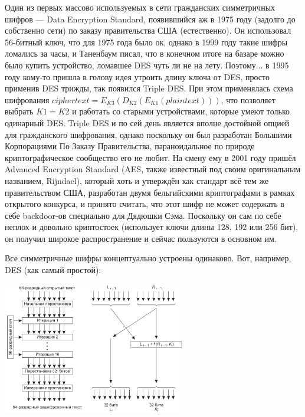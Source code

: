 \documentclass{../mcstext}
\begin{document}
Один из первых массово используемых в сети гражданских симметричных шифров --- Data Encryption Standard, появившийся аж в 1975 году (задолго до собственно сети) по заказу правительства США (естественно). Он использовал 56-битный ключ, что для 1975 года было ок, однако в 1999 году такие шифры ломались за часы, и Таненбаум писал, что в конечном итоге на базаре можно было купить устройство, ломавшее DES чуть ли не на лету. Поэтому... в 1995 году кому-то пришла в голову идея утроить длину ключа от DES, просто применив DES трижды, так появился Triple DES. При этом применялась схема шифрования $ciphertext = E_{K3}(D_{K2}(E_{K1}(plaintext)))$, что позволяет выбрать $K1 = K2$ и работать со старыми устройствами, которые умеют только одинарный DES. Triple DES и по сей день является вполне достойной опцией для гражданского шифрования, однако поскольку он был разработан Большими Корпорациями По Заказу Правительства, параноидальное по природе криптографическое сообщество его не любит. На смену ему в 2001 году пришёл Advanced Encryption Standard (AES, также известный под своим оригинальным названием, Rijndael), который хоть и утверждён как стандарт всё тем же правительством США, разработан двумя бельгийскими криптографами в рамках открытого конкурса, и принято считать, что этот шифр не может содержать в себе backdoor-ов специально для Дядюшки Сэма. Поскольку он сам по себе неплох и довольно криптостоек (использует ключи длины 128, 192 или 256 бит), он получил широкое распространение и сейчас пользуются в основном им.

Все симметричные шифры концептуально устроены одинаково. Вот, например, DES (как самый простой):

\begin{center}
    \includegraphics[width=0.6\textwidth]{des.png}
\end{center}
\end{document}
